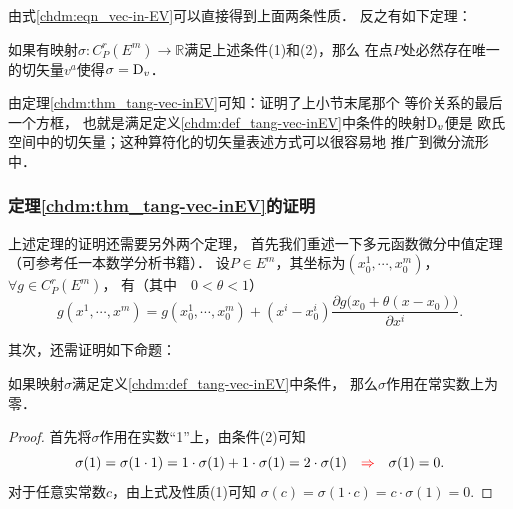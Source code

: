 由式\eqref{chdm:eqn_vec-in-EV}可以直接得到上面两条性质．
反之有如下定理：  
\begin{theorem}\label{chdm:thm_tang-vec-inEV}
    如果有映射$\sigma:C^r_P(E^m) \to \mathbb{R}$满足上述条件(1)和(2)，那么
    在点$P$处必然存在唯一的切矢量$v^a$使得$\sigma = {\rm D}_v$．
\end{theorem}
{\kaishu 由定理\ref{chdm:thm_tang-vec-inEV}可知：证明了上小节末尾那个
等价关系的最后一个方框}，
也就是满足定义\ref{chdm:def_tang-vec-inEV}中条件的映射${\rm D}_v$便是
欧氏空间中的{\heiti 切矢量}；这种算符化的切矢量表述方式可以很容易地
推广到微分流形中．

\subsubsection{定理\ref{chdm:thm_tang-vec-inEV}的证明}
上述定理的证明还需要另外两个定理，
首先我们重述一下多元函数微分中值定理（可参考任一本数学分析书籍）．
设$P\in E^m$，其坐标为$(x^1_0,\cdots,x^m_0)$，$\forall g\in C^r_P(E^m)$，
有（其中$\quad 0<\theta<1$）
\begin{equation}\label{chdm:eqn_wfzzdl}
    g(x^1,\cdots,x^m)=g(x^1_0,\cdots,x^m_0)+ 
    (x^i-x^i_0) \frac{\partial g\bigl(x_0+\theta(x-x_0) \bigr)}{\partial x^i}.        
\end{equation}

其次，还需证明如下命题：
\begin{proposition}\label{chdm:thm_dc0}
    如果映射$\sigma$满足定义\ref{chdm:def_tang-vec-inEV}中条件，
    那么$\sigma$作用在常实数上为零．    
\end{proposition}
\begin{proof}
    首先将$\sigma$作用在实数“1”上，由条件(2)可知
    \begin{equation*}
        \sigma(1)=\sigma(1\cdot 1)=1\cdot \sigma(1)+ 1\cdot \sigma(1)
        =2\cdot \sigma(1) 
        \quad {\color{red}\Rightarrow} \quad
        \sigma(1)=0.        
    \end{equation*}
    对于任意实常数$c$，由上式及性质(1)可知
    $\sigma(c)=\sigma(1\cdot c)=c\cdot \sigma(1)=0.$
\end{proof}

